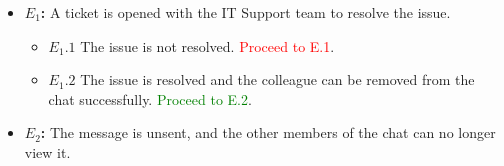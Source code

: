 \documentclass[]{article}
\begin{document}
\begin{enumerate}[\bf {BE}9.]
{{\begin{itemize}
                        \item {\bf $E_{1}$:}  A ticket is opened with the IT Support team to resolve the issue.
                            \begin{itemize}
                                \item {\bf $E_{1}.1$} The issue is not resolved. \textcolor{red}{Proceed to E.1}.
                                \item {\bf $E_{1}.2$} The issue is resolved and the colleague can be removed from the chat successfully. \textcolor{green}{Proceed to E.2}.
                            \end{itemize}
                        
					   \item {\bf $E_{2}$:}  The message is unsent, and the other members of the chat can no longer view it.
                            
				\end{itemize}
			}%
		}%
		\end{enumerate}
\end{document}
